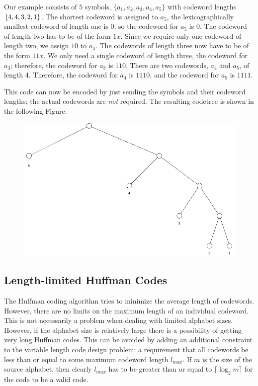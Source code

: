 Our example consists of $5$ symbols, $\{a_1, a_2, a_3, a_4, a_5\}$ with codeword lengths $\{4,4,3,2 \\,1\}$. The shortest codeword is assigned to $a_5$, the lexicographically smallest codeword of length one is $0$, so the codeword for $a_5$ is $0$. The codeword of length two has to be of the form $1x$. Since we require only one codeword of length two, we assign $10$ to $a_4$. The codewords of length three now have to be of the form $11x$. We only need a single codeword of length three, the codeword for $a_3$; therefore, the codeword for $a_3$ is $110$. There are two codewords, $a_4$ and $a_5$, of length 4. Therefore, the codeword for $a_4$ is $1110$, and the codeword for $a_5$ is $1111$.

This code can now be encoded by just sending the symbols and their codeword lengths; the actual codewords are \emph{not} required. The resulting codetree is shown in the following Figure.

\begin{figure}[H]
    \centering
    \includegraphics[scale=0.4]{images/2021-05-03_tree_03.png}
\end{figure}


\subsection{Length-limited Huffman Codes}

The Huffman coding algorithm tries to minimize the average length of codewords. However, there are no limits on the maximum length of an individual codeword. This is not necessarily a problem when dealing with limited alphabet sizes. However, if the alphabet size is relatively large there is a possibility of getting very long Huffman codes. This can be avoided by adding an additional constraint to the variable length code design problem: a requirement that all codewords be less than or equal to some maximum codeword length $l_{max}$. If $m$ is the size of the source alphabet, then clearly $l_{max}$ has to be greater than or equal to $\lceil \log_2 m \rceil$ for the code to be a valid code.

